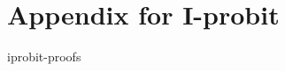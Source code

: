 \documentclass[a4paper,11pt,showframe]{report}
\begin{document}
\appendix

\chapter{Appendix for I-probit}
{iprobit-proofs}

\printindex
\end{document}
